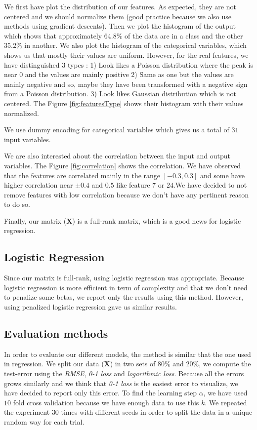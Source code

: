 \documentclass{article} %
\begin{document}
We first have plot the distribution of our features. As expected, they are not centered and we should normalize them (good practice because we also use methods using gradient descents). Then we plot the histogram of the output which shows that approximately $64.8\%$ of the data are in a class and the other $35.2\%$ in another. We also plot the histogram of the categorical variables, which shows us that mostly their values are uniform. However, for the real features, we have distinguished 3 types : 1) Look likes a Poisson distribution where the peak is near 0 and the values are mainly positive 2) Same as one but the values are mainly negative and so, maybe they have been transformed with a negative sign from a Poisson distribution. 3) Look likes Gaussian distribution which is not centered. The Figure \ref{fig:featuresType} shows their histogram with their values normalized.

We use dummy encoding for categorical variables which gives us a total of $31$ input variables.

We are also interested about the correlation between the input and output variables. The Figure \ref{fig:correlation} shows the correlation. We have observed that the features are correlated mainly in the range $[-0.3,0.3]$ and some have higher correlation near $\pm0.4$ and $0.5$ like feature $7$ or $24$.We have decided to not remove features with low correlation because we don't have any pertinent reason to do so.

Finally, our matrix ($\mathbf{X}$) is a full-rank matrix, which is a good news for logistic regression.

\subsection{Logistic Regression}

Since our matrix is full-rank, using logistic regression was appropriate. Because logistic regression is more efficient in term of complexity and that we don't need to penalize some betas, we report only the results using this method. However, using penalized logistic regression gave us similar results.

\subsection{Evaluation methods}

In order to evaluate our different models, the method is similar that the one used in regression. We split our data ($\mathbf{X}$) in two sets of $80\%$ and $20\%$, we compute the test-error using the \textit{RMSE}, \textit{0-1 loss} and \textit{logarithmic loss}. Because all the errors grows similarly and we think that \textit{0-1 loss} is the easiest error to visualize, we have decided to report only this error. To find the learning step $\alpha$, we have used $10$ fold cross validation because we have enough data to use this $k$. We repeated the experiment $30$ times with different seeds in order to split the data in a unique random way for each trial.
\end{document}
